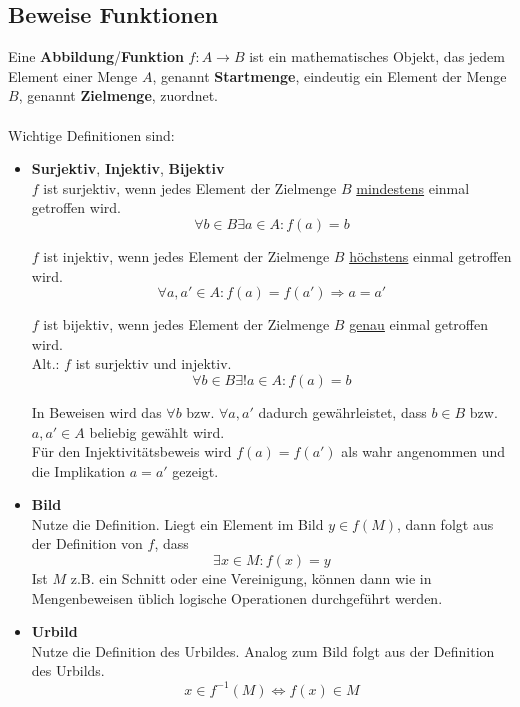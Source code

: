 \documentclass{article}
\begin{document}
\subsection*{Beweise Funktionen}
Eine \textbf{Abbildung}/\textbf{Funktion} $f:A\to B$ ist ein mathematisches Objekt, das jedem Element einer Menge $A$, genannt \textbf{Startmenge}, eindeutig ein Element der Menge $B$, genannt \textbf{Zielmenge}, zuordnet.\\
\\
Wichtige Definitionen sind:
\begin{itemize}
	\item \textbf{Surjektiv}, \textbf{Injektiv}, \textbf{Bijektiv}\\
	$f$ ist surjektiv, wenn jedes Element der Zielmenge $B$ \underline{mindestens} einmal getroffen wird.
		\begin{equation}
			\forall b\in B \exists a\in A: f(a) = b
		\end{equation}
	
	$f$ ist injektiv, wenn jedes Element der Zielmenge $B$ \underline{höchstens} einmal getroffen wird.
		\begin{equation}
			\forall a,a'\in A: f(a)=f(a') \Rightarrow a=a'
		\end{equation}

	$f$ ist bijektiv, wenn jedes Element der Zielmenge $B$ \underline{genau} einmal getroffen wird.\\
	Alt.: $f$ ist surjektiv und injektiv.
		\begin{equation}
			\forall b\in B \exists ! a\in A: f(a) = b
		\end{equation}

\textcolor{gruen}{In Beweisen wird das $\forall b$ bzw. $\forall a,a'$ dadurch gewährleistet, dass $b\in B$ bzw. $a,a'\in A$ beliebig gewählt wird.\\
Für den Injektivitätsbeweis wird $f(a)=f(a')$ als wahr angenommen und die Implikation $a=a'$ gezeigt.}


	\item \textbf{Bild}\\
	Nutze die Definition. Liegt ein Element im Bild $y\in f(M)$, dann folgt aus der Definition von $f$, dass
		\begin{equation}
			\exists x\in M: f(x)=y
		\end{equation}
	Ist $M$ z.B. ein Schnitt oder eine Vereinigung, können dann wie in Mengenbeweisen üblich logische Operationen durchgeführt werden.
		
	\item \textbf{Urbild}\\
	Nutze die Definition des Urbildes. Analog zum Bild folgt aus der Definition des Urbilds.
		\begin{equation}
			x\in f^{-1}(M) \Leftrightarrow f(x)\in M
		\end{equation}
\end{itemize}
\end{document}
